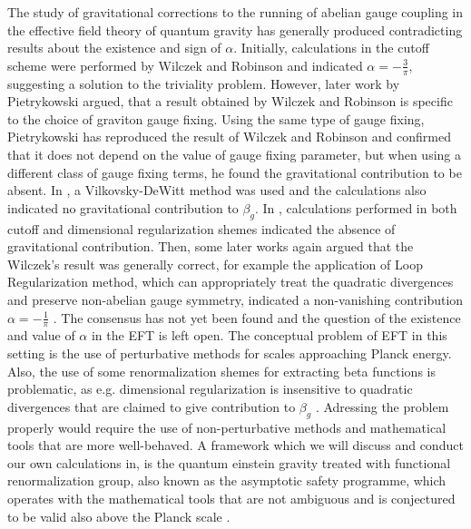 \documentclass[11pt, a4paper]{article}
\begin{document}
The study of gravitational corrections to the running of abelian gauge coupling in the effective field theory of quantum gravity has generally produced contradicting results about the existence and sign of $\alpha$.
Initially, calculations in the cutoff scheme were performed by Wilczek and Robinson \cite{wilczek} and indicated
$\alpha = - \frac{3}{\pi} $, suggesting a solution to the triviality problem.
However, later work by Pietrykowski \cite{pietrykowski} argued, that a result obtained by Wilczek and Robinson is specific to the choice of graviton gauge fixing.
Using the same type of gauge fixing, Pietrykowski has reproduced the result of Wilczek and Robinson and confirmed that it does not depend on the value of gauge fixing parameter, but when using a different class of gauge fixing terms, he found the gravitational contribution to be absent.
In \cite{toms}, a Vilkovsky-DeWitt method was used and the calculations also indicated no gravitational contribution to $\beta_g$.
In \cite{absence}, calculations performed in both cutoff and dimensional regularization shemes indicated the absence of gravitational contribution.
Then, some later works again argued that the Wilczek's result was generally correct, for example the application of Loop Regularization method, which can appropriately treat the quadratic divergences and preserve non-abelian gauge symmetry,
indicated a non-vanishing contribution $\alpha = -\frac{1}{\pi} $ \cite{tang}.
The consensus has not yet been found and the question of the existence and value of $\alpha$ in the EFT is left open.
The conceptual problem of EFT in this setting is the use of perturbative methods for scales approaching Planck energy.
Also, the use of some renormalization shemes for extracting beta functions is problematic, as e.g. dimensional regularization is insensitive to quadratic
divergences that are claimed to give contribution to $\beta_g$ \cite{absence}.
Adressing the problem properly would require the use of non-perturbative methods and mathematical tools that are more well-behaved.
A framework which we will discuss and conduct our own calculations in, is the quantum einstein gravity treated with functional renormalization group, also known as the asymptotic safety programme, which operates with the mathematical tools that are not ambiguous and
is conjectured to be valid also above the Planck scale \cite{qeg}.


\end{document}
